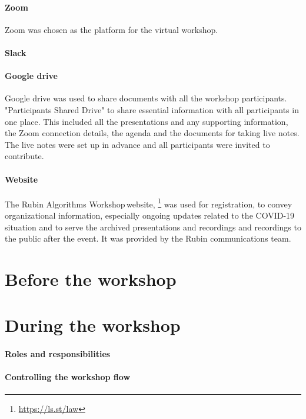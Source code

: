 \documentclass[DM,authoryear,toc]{lsstdoc}
\newcommand{\cvd}{COVID-19\,}
\newcommand{\raw}{Rubin Algorithms Workshop\,}
\begin{document}
\paragraph{Zoom}
Zoom was chosen as the platform for the virtual workshop. 

\paragraph{Slack}

\paragraph{Google drive}
Google drive was used to share documents with all the workshop participants.  "Participants Shared Drive"  to share essential information with all participants in one place. 
This included all the presentations and any supporting information, the Zoom connection details, the agenda and the documents for taking live notes. 
The live notes were set up in advance and all participants were invited to contribute.  

\paragraph{Website}
The \raw website, \footnote{\url{https://ls.st/law}\label{law}} was used for registration, to convey  organizational information, especially ongoing updates related to the \cvd situation and to serve the archived presentations and recordings and recordings to the public after the event. It was provided by the Rubin communications team. 

\section{Before the workshop}

\section{During the workshop}



\paragraph{Roles and responsibilities}
\paragraph{Controlling the workshop flow}
\end{document}

